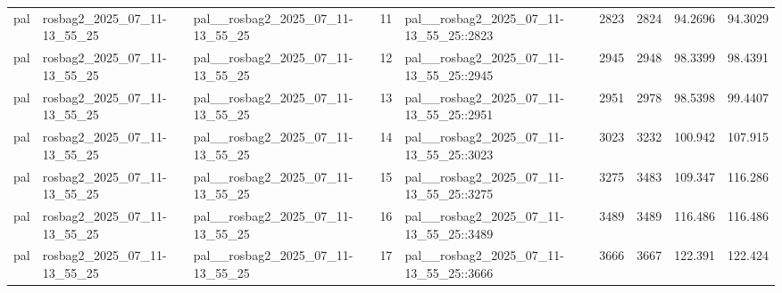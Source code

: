 \begin{longtable}{lllrlllrr}
pal & rosbag2\_2025\_07\_11-13\_55\_25 & pal\_\_rosbag2\_2025\_07\_11-13\_55\_25 & 11 & pal\_\_rosbag2\_2025\_07\_11-13\_55\_25::2823 & 2823 & 2824 & 94.2696 & 94.3029 \\
pal & rosbag2\_2025\_07\_11-13\_55\_25 & pal\_\_rosbag2\_2025\_07\_11-13\_55\_25 & 12 & pal\_\_rosbag2\_2025\_07\_11-13\_55\_25::2945 & 2945 & 2948 & 98.3399 & 98.4391 \\
pal & rosbag2\_2025\_07\_11-13\_55\_25 & pal\_\_rosbag2\_2025\_07\_11-13\_55\_25 & 13 & pal\_\_rosbag2\_2025\_07\_11-13\_55\_25::2951 & 2951 & 2978 & 98.5398 & 99.4407 \\
pal & rosbag2\_2025\_07\_11-13\_55\_25 & pal\_\_rosbag2\_2025\_07\_11-13\_55\_25 & 14 & pal\_\_rosbag2\_2025\_07\_11-13\_55\_25::3023 & 3023 & 3232 & 100.942 & 107.915 \\
pal & rosbag2\_2025\_07\_11-13\_55\_25 & pal\_\_rosbag2\_2025\_07\_11-13\_55\_25 & 15 & pal\_\_rosbag2\_2025\_07\_11-13\_55\_25::3275 & 3275 & 3483 & 109.347 & 116.286 \\
pal & rosbag2\_2025\_07\_11-13\_55\_25 & pal\_\_rosbag2\_2025\_07\_11-13\_55\_25 & 16 & pal\_\_rosbag2\_2025\_07\_11-13\_55\_25::3489 & 3489 & 3489 & 116.486 & 116.486 \\
pal & rosbag2\_2025\_07\_11-13\_55\_25 & pal\_\_rosbag2\_2025\_07\_11-13\_55\_25 & 17 & pal\_\_rosbag2\_2025\_07\_11-13\_55\_25::3666 & 3666 & 3667 & 122.391 & 122.424 \\
\end{longtable}
